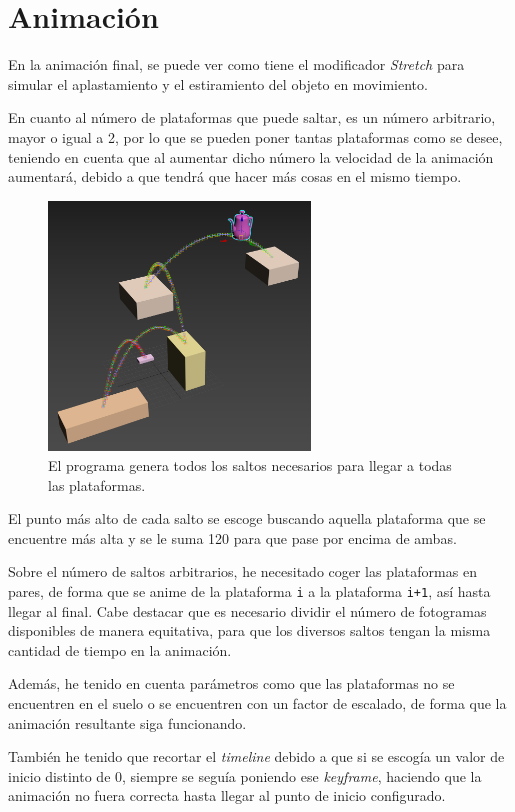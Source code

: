 \section{Animación}

En la animación final, se puede ver como tiene el modificador \textit{Stretch} para simular el aplastamiento y el estiramiento del objeto en movimiento. 

\bigskip

En cuanto al número de plataformas que puede saltar, es un número arbitrario, mayor o igual a 2, por lo que se pueden poner tantas plataformas como se desee, teniendo en cuenta que al aumentar dicho número la velocidad de la animación aumentará, debido a que tendrá que hacer más cosas en el mismo tiempo.

\begin{figure}[H]
   \centering
   \includegraphics[width=0.62\textwidth]{imagenes/path varios saltos.png}
   \caption{El programa genera todos los saltos necesarios para llegar a todas las plataformas.}
\end{figure}

El punto más alto de cada salto se escoge buscando aquella plataforma que se encuentre más alta y se le suma 120 para que pase por encima de ambas.

\bigskip

Sobre el número de saltos arbitrarios, he necesitado coger las plataformas en pares, de forma que se anime de la plataforma \verb|i| a la plataforma \verb|i+1|, así hasta llegar al final. Cabe destacar que es necesario dividir el número de fotogramas disponibles de manera equitativa, para que los diversos saltos tengan la misma cantidad de tiempo en la animación.

\bigskip

Además, he tenido en cuenta parámetros como que las plataformas no se encuentren en el suelo o se encuentren con un factor de escalado, de forma que la animación resultante siga funcionando.

\bigskip

También he tenido que recortar el \textit{timeline} debido a que si se escogía un valor de inicio distinto de 0, siempre se seguía poniendo ese \textit{keyframe}, haciendo que la animación no fuera correcta hasta llegar al punto de inicio configurado.
